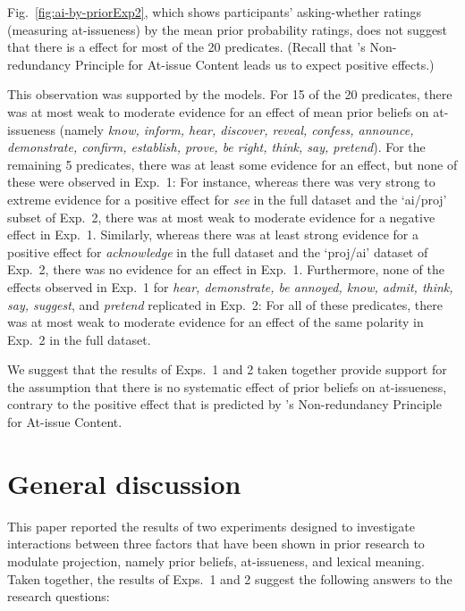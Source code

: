 \documentclass[11pt,fleqn]{article}
\newcommand{\6}{\mbox{$[\hspace*{-.6mm}[$}}
\newcommand{\9}{\mbox{$]\hspace*{-.6mm}]$}}
\newcommand{\citepos}[1]{\citeauthor{#1}'s \citeyear{#1}}
\begin{document}
Fig.~\ref{fig:ai-by-priorExp2}, which shows participants' asking-whether ratings (measuring at-issueness) by the mean prior probability ratings, does not suggest that there is a effect for most of the 20 predicates. (Recall that \citepos{tonhauser-etal-eval} Non-redundancy Principle for At-issue Content leads us to expect positive effects.)

This observation was supported by the models. For 15 of the 20 predicates, there was at most weak to moderate evidence for an effect of mean prior beliefs on at-issueness (namely {\em know, inform, hear, discover, reveal, confess, announce, demonstrate, confirm, establish, prove, be right, think, say, pretend}). For the remaining 5 predicates, there was at least some evidence for an effect, but none of these were observed in Exp.~1: For instance, whereas there was very strong to extreme evidence for a positive effect for {\em see} in the full dataset and the `ai/proj' subset of Exp.~2, there was at most weak to moderate evidence for a negative effect in Exp.~1. Similarly, whereas there was at least strong evidence for a positive effect for {\em acknowledge} in the full dataset and the `proj/ai' dataset of Exp.~2, there was no evidence for an effect in Exp.~1. Furthermore, none of the effects observed in Exp.~1 for {\em hear, demonstrate, be annoyed, know, admit, think, say, suggest}, and {\em pretend} replicated in Exp.~2: For all of these predicates, there was at most weak to moderate evidence for an effect of the same polarity in Exp.~2 in the full dataset. 

We suggest that the results of Exps.~1 and 2 taken together provide support for the assumption that there is no systematic effect of prior beliefs on at-issueness, contrary to the positive effect that is predicted by \citepos{tonhauser-etal-eval} Non-redundancy Principle for At-issue Content.

\section{General discussion}\label{s4}

This paper  reported the results of two experiments designed to investigate interactions between three factors that have been shown in prior research to modulate projection, namely prior beliefs, at-issueness, and lexical meaning. Taken together, the results of Exps.~1 and 2 suggest the following answers to the research questions:
\end{document}
